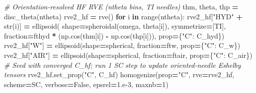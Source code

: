 \documentclass[
  a4paper,
  numbers=noendperiod,
  DIV=12]{scrreprt}
\newenvironment{Shaded}{\begin{snugshade}}{\end{snugshade}}
\newcommand{\BuiltInTok}[1]{#1}
\newcommand{\CommentTok}[1]{\textcolor[rgb]{0.56,0.35,0.01}{\textit{#1}}}
\newcommand{\ControlFlowTok}[1]{\textcolor[rgb]{0.13,0.29,0.53}{\textbf{#1}}}
\newcommand{\DecValTok}[1]{\textcolor[rgb]{0.00,0.00,0.81}{#1}}
\newcommand{\FloatTok}[1]{\textcolor[rgb]{0.00,0.00,0.81}{#1}}
\newcommand{\KeywordTok}[1]{\textcolor[rgb]{0.13,0.29,0.53}{\textbf{#1}}}
\newcommand{\NormalTok}[1]{#1}
\newcommand{\OperatorTok}[1]{\textcolor[rgb]{0.81,0.36,0.00}{\textbf{#1}}}
\newcommand{\StringTok}[1]{\textcolor[rgb]{0.31,0.60,0.02}{#1}}
\newcommand{\VariableTok}[1]{\textcolor[rgb]{0.00,0.00,0.00}{#1}}
\begin{document}
\begin{Shaded}
\begin{Highlighting}[]
    \CommentTok{\# Orientation{-}resolved HF RVE (ntheta bins, TI needles)}
\NormalTok{    thm, theta, thp }\OperatorTok{=}\NormalTok{ disc\_theta(ntheta)}
\NormalTok{    rve2\_hf }\OperatorTok{=}\NormalTok{ rve()}
    \ControlFlowTok{for}\NormalTok{ i }\KeywordTok{in} \BuiltInTok{range}\NormalTok{(ntheta):}
\NormalTok{        rve2\_hf[}\StringTok{"HYD"} \OperatorTok{+} \BuiltInTok{str}\NormalTok{(i)] }\OperatorTok{=}\NormalTok{ ellipsoid(}
\NormalTok{            shape}\OperatorTok{=}\NormalTok{spheroidal(omega, theta[i]), symmetrize}\OperatorTok{=}\NormalTok{[TI],}
\NormalTok{            fraction}\OperatorTok{=}\NormalTok{fthyd }\OperatorTok{*}\NormalTok{ (np.cos(thm[i]) }\OperatorTok{{-}}\NormalTok{ np.cos(thp[i])),}
\NormalTok{            prop}\OperatorTok{=}\NormalTok{\{}\StringTok{"C"}\NormalTok{: C\_hyd\})}
\NormalTok{    rve2\_hf[}\StringTok{"W"}\NormalTok{]   }\OperatorTok{=}\NormalTok{ ellipsoid(shape}\OperatorTok{=}\NormalTok{spherical, fraction}\OperatorTok{=}\NormalTok{ftw,   prop}\OperatorTok{=}\NormalTok{\{}\StringTok{"C"}\NormalTok{: C\_w\})}
\NormalTok{    rve2\_hf[}\StringTok{"AIR"}\NormalTok{] }\OperatorTok{=}\NormalTok{ ellipsoid(shape}\OperatorTok{=}\NormalTok{spherical, fraction}\OperatorTok{=}\NormalTok{ftair, prop}\OperatorTok{=}\NormalTok{\{}\StringTok{"C"}\NormalTok{: C\_air\})}
    \CommentTok{\# Seed with converged C\_hf; run 1 SC step to update oriented{-}needle Eshelby tensors}
\NormalTok{    rve2\_hf.set\_prop(}\StringTok{"C"}\NormalTok{, C\_hf)}
\NormalTok{    homogenize(prop}\OperatorTok{=}\StringTok{"C"}\NormalTok{, rve}\OperatorTok{=}\NormalTok{rve2\_hf, scheme}\OperatorTok{=}\NormalTok{SC,}
\NormalTok{               verbose}\OperatorTok{=}\VariableTok{False}\NormalTok{, epsrel}\OperatorTok{=}\FloatTok{1.e{-}3}\NormalTok{, maxnb}\OperatorTok{=}\DecValTok{1}\NormalTok{)}


\end{Highlighting}
\end{Shaded}
\end{document}
